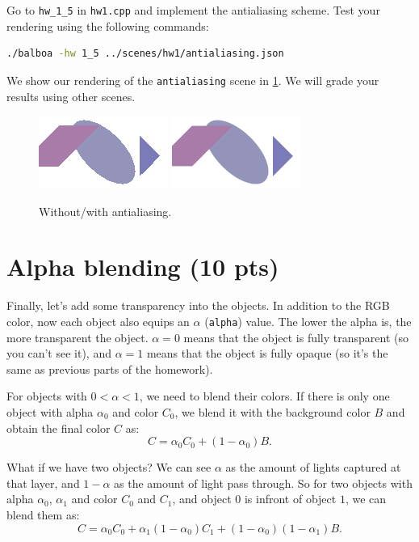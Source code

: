 Go to \lstinline{hw_1_5} in \lstinline{hw1.cpp} and implement the antialiasing scheme. Test your rendering using the following commands:
\begin{lstlisting}[language=bash]
  ./balboa -hw 1_5 ../scenes/hw1/antialiasing.json
\end{lstlisting}

We show our rendering of the \lstinline{antialiasing} scene in \cref{fig:hw1_5}. We will grade your results using other scenes.

\begin{figure}[ht]
    \centering
    \includegraphics[width=0.4\linewidth]{imgs/hw_1_5before.png}
    \includegraphics[width=0.4\linewidth]{imgs/hw_1_5after.png}
    \caption{Without/with antialiasing.}
    \label{fig:hw1_5}
\end{figure}

\section{Alpha blending (10 pts)}
Finally, let's add some transparency into the objects. In addition to the RGB color, now each object also equips an $\alpha$ (\lstinline{alpha}) value. The lower the alpha is, the more transparent the object. $\alpha=0$ means that the object is fully transparent (so you can't see it), and $\alpha=1$ means that the object is fully opaque (so it's the same as previous parts of the homework). 

For objects with $0 < \alpha < 1$, we need to blend their colors. If there is only one object with alpha $\alpha_0$ and color $C_0$, we blend it with the background color $B$ and obtain the final color $C$ as:
\begin{equation}
C = \alpha_0 C_0 + (1 - \alpha_0) B.
\end{equation}

What if we have two objects? We can see $\alpha$ as the amount of lights captured at that layer, and $1-\alpha$ as the amount of light pass through. So for two objects with alpha $\alpha_0$, $\alpha_1$ and color $C_0$ and $C_1$, and object $0$ is infront of object $1$, we can blend them as:
\begin{equation}
C = \alpha_0 C_0 + \alpha_1 (1 - \alpha_0) C_1 + (1 - \alpha_0) (1 - \alpha_1) B.
\end{equation}

